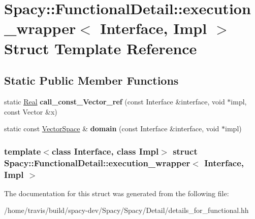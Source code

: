 \hypertarget{structSpacy_1_1FunctionalDetail_1_1execution__wrapper}{\section{\-Spacy\-:\-:\-Functional\-Detail\-:\-:execution\-\_\-wrapper$<$ \-Interface, \-Impl $>$ \-Struct \-Template \-Reference}
\label{structSpacy_1_1FunctionalDetail_1_1execution__wrapper}
}
\subsection*{\-Static \-Public \-Member \-Functions}
\begin{DoxyCompactItemize}
\item 
\hypertarget{structSpacy_1_1FunctionalDetail_1_1execution__wrapper_af4e8e20573cde5b953d084bea7cf513b}{static \hyperlink{classSpacy_1_1Real}{\-Real} {\bfseries call\-\_\-const\-\_\-\-Vector\-\_\-ref} (const \-Interface \&interface, void $\ast$impl, const \-Vector \&x)}\label{structSpacy_1_1FunctionalDetail_1_1execution__wrapper_af4e8e20573cde5b953d084bea7cf513b}

\item 
\hypertarget{structSpacy_1_1FunctionalDetail_1_1execution__wrapper_aa0624a0b32b524cc6dec50caa9edea02}{static const \hyperlink{classSpacy_1_1VectorSpace}{\-Vector\-Space} \& {\bfseries domain} (const \-Interface \&interface, void $\ast$impl)}\label{structSpacy_1_1FunctionalDetail_1_1execution__wrapper_aa0624a0b32b524cc6dec50caa9edea02}

\end{DoxyCompactItemize}
\subsubsection*{template$<$class Interface, class Impl$>$ struct Spacy\-::\-Functional\-Detail\-::execution\-\_\-wrapper$<$ Interface, Impl $>$}



\-The documentation for this struct was generated from the following file\-:\begin{DoxyCompactItemize}
\item 
/home/travis/build/spacy-\/dev/\-Spacy/\-Spacy/\-Detail/details\-\_\-for\-\_\-functional.\-hh\end{DoxyCompactItemize}
